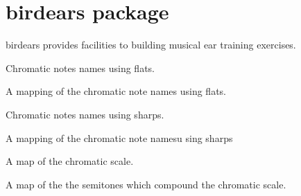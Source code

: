 \documentclass[letterpaper,10pt,english]{sphinxmanual}
\begin{document}
\chapter{birdears package}
\label{\detokenize{index:module-birdears}}\label{\detokenize{index:birdears-package}}
birdears provides facilities to building musical ear training exercises.

\begin{fulllineitems}
\label{\detokenize{index:birdears.CHROMATIC_FLAT}}
 \textendash{} Chromatic notes names using flats.

A mapping of the chromatic note names using flats.

\end{fulllineitems}


\begin{fulllineitems}
\label{\detokenize{index:birdears.CHROMATIC_SHARP}}
 \textendash{} Chromatic notes names using sharps.

A mapping of the chromatic note namesu sing sharps

\end{fulllineitems}


\begin{fulllineitems}
\label{\detokenize{index:birdears.CHROMATIC_TYPE}}
 \textendash{} A map of the chromatic scale.

A map of the the semitones which compound the chromatic scale.

\end{fulllineitems}

\end{document}
